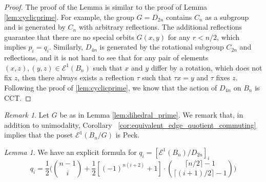 \documentclass[10 pt]{amsart}
\theoremstyle{plain}
\theoremstyle{definition}
\theoremstyle{remark}
\numberwithin{equation}{section}
\newtheorem{lem}[thm]{Lemma}
\theoremstyle{remark}
\newtheorem{rem}[thm]{Remark}
\begin{document}
\begin{proof}
The proof of the Lemma is similar to the proof of Lemma \ref{lem:cyclicprime}. For example, the group $G = D_{2n}$ contains $C_n$ as a subgroup and is generated by $C_n$ with arbitrary reflections. The additional reflections guarantee that there are no special orbits $G(x , y)$ for any $r < n/2$, which implies $p_i = q_i$. Similarly, $D_{4n}$ is generated by the rotational subgroup $C_{2n}$ and reflections, and it is not hard to see that for any pair of elements $(x, z), (y, z) \in \mathcal E^1(B_n)$ such that $x$ and $y$ differ by a rotation, which does not fix $z$, then there always exists a reflection $\tau$ such that $\tau x = y$ and $\tau$ fixes $z$.  Following the proof of \ref{lem:cyclicprime}, we know that the action of $D_{4n}$ on $B_n$ is CCT.
\end{proof}

\begin{rem}
Let $G$ be as in Lemma \ref{lem:dihedral_prime}. We remark that, in addition to unimodality, Corollary ~\ref{cor:equivalent_edge_quotient_commuting} implies that the poset $\mathcal E^1(B_n/G)$ is Peck.
\end{rem}


\begin{lem}{\label{dihedral002}}
 We have an explicit formula for $q_i = [\mathcal E^1 (B_n)/D_{2n}]_i$
$$q_i = \frac{1}{2} \Big( {n-1 \choose i } + \frac{1}{2} [(-1)^{n(i+2)}+1] \cdot { \lceil n/2\rceil -1  \choose \lceil (i+1)/2 \rceil - 1}  \Big)$$
\end{lem}
\end{document}
